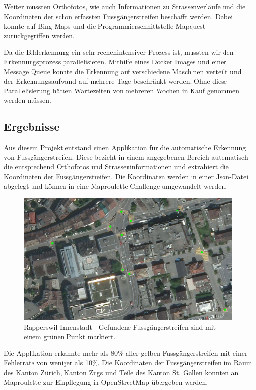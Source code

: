 Weiter mussten Orthofotos, wie auch Informationen zu Strassenverläufe und die Koordinaten der schon erfassten Fussgängerstreifen beschafft werden. Dabei konnte auf Bing Maps und die Programmierschnittstelle Mapquest zurückgegriffen werden.

Da die Bilderkennung ein sehr rechenintensiver Prozess ist, mussten wir den Erkennungsprozess parallelisieren. Mithilfe eines Docker Images und einer Message Queue konnte die Erkennung auf verschiedene Maschinen verteilt und der Erkennungsaufwand auf mehrere Tage beschränkt werden. Ohne diese Parallelisierung hätten Wartezeiten von mehreren Wochen in Kauf genommen werden müssen.


\subsection*{Ergebnisse}
Aus diesem Projekt entstand einen Applikation für die automatische Erkennung von Fussgängerstreifen. Diese bezieht in einem angegebenen Bereich automatisch die entsprechend Orthofotos und Strasseninformationen und extrahiert die Koordinaten der Fussgängerstreifen. Die Koordinaten werden in einer Json-Datei abgelegt und können in eine Maproulette Challenge umgewandelt werden. 
\\
\begin{figure}[H]
	\centering
	\includegraphics[width=\textwidth -10mm]{images/boxsave_rappi.png}
	\caption[Überblick]{Rapperswil Innenstadt - Gefundene Fussgängerstreifen sind mit einem grünen Punkt markiert.}
\end{figure}
Die Applikation erkannte mehr als 80\% aller gelben Fussgängerstreifen mit einer Fehlerrate von weniger als 10\%. Die Koordinaten der Fussgängerstreifen im Raum des Kanton Zürich, Kanton Zugs und Teile des Kanton St. Gallen konnten an Maproulette zur Einpflegung in OpenStreetMap übergeben werden.
